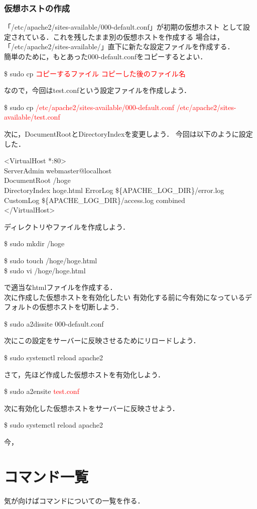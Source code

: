 \documentclass[dvipdfmx,a4paper,11pt]{jsbook}
\begin{document}
\subsection{仮想ホストの作成}
「/etc/apache2/sites-available/000-default.conf」が初期の仮想ホスト
として設定されている．これを残したまま別の仮想ホストを作成する
場合は，「/etc/apache2/sites-available/」直下に新たな設定ファイルを作成する．\\
簡単のために，もとあった000-default.confをコピーするとよい．
\begin{tcolorbox}[terminalbox]
  \$ sudo cp \textcolor{red}{コピーするファイル} \textcolor{red}{コピーした後のファイル名}
\end{tcolorbox}
なので，今回はtest.confという設定ファイルを作成しよう．
\begin{tcolorbox}[terminalbox]
  \$ sudo cp \textcolor{red}{/etc/apache2/sites-available/000-default.conf} \textcolor{red}{/etc/apache2/sites-available/test.conf}
\end{tcolorbox}
次に，DocumentRootとDirectoryIndexを変更しよう．
今回は以下のように設定した．
\begin{tcolorbox}[terminalbox]
  <VirtualHost *:80>\\
  \qquad ServerAdmin webmaster@localhost\\
  \qquad DocumentRoot /hoge\\
  \qquad DirectoryIndex hoge.html
  \qquad ErrorLog \$\{APACHE\_LOG\_DIR\}/error.log\\
  \qquad CustomLog \$\{APACHE\_LOG\_DIR\}/access.log combined\\
  </VirtualHost>
\end{tcolorbox}
ディレクトリやファイルを作成しよう．
\begin{tcolorbox}[terminalbox]
  \$ sudo mkdir /hoge
\end{tcolorbox}
\begin{tcolorbox}[terminalbox]
  \$ sudo touch /hoge/hoge.html\\
  \$ sudo vi /hoge/hoge.html
\end{tcolorbox}
で適当なhtmlファイルを作成する．\\
次に作成した仮想ホストを有効化したい
有効化する前に今有効になっているデフォルトの仮想ホストを切断しよう．
\begin{tcolorbox}[terminalbox]
  \$ sudo a2dissite 000-default.conf
\end{tcolorbox}
次にこの設定をサーバーに反映させるためにリロードしよう．
\begin{tcolorbox}[terminalbox]
  \$ sudo systemctl reload apache2
\end{tcolorbox}
さて，先ほど作成した仮想ホストを有効化しよう．
\begin{tcolorbox}[terminalbox]
  \$ sudo a2ensite \textcolor{red}{test.conf}
\end{tcolorbox}
次に有効化した仮想ホストをサーバーに反映させよう．
\begin{tcolorbox}[terminalbox]
  \$ sudo systemctl reload apache2
\end{tcolorbox}
今，








\appendix
\chapter{コマンド一覧}
気が向けばコマンドについての一覧を作る．
\end{document}
